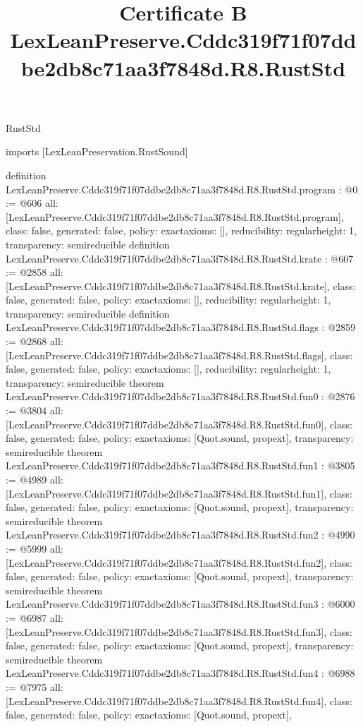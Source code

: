 \begin{lexlean}{RustStd}
\title{Certificate B LexLeanPreserve.Cddc319f71f07ddbe2db8c71aa3f7848d.R8.RustStd}
\begin{coremodule}
imports [LexLeanPreservation.RustSound]

definition LexLeanPreserve.Cddc319f71f07ddbe2db8c71aa3f7848d.R8.RustStd.program : @0 := @606 {
  all: [LexLeanPreserve.Cddc319f71f07ddbe2db8c71aa3f7848d.R8.RustStd.program],
  class: false,
  generated: false,
  policy: exact{axioms: []},
  reducibility: regular{height: 1},
  transparency: semireducible
}
definition LexLeanPreserve.Cddc319f71f07ddbe2db8c71aa3f7848d.R8.RustStd.krate : @607 := @2858 {
  all: [LexLeanPreserve.Cddc319f71f07ddbe2db8c71aa3f7848d.R8.RustStd.krate],
  class: false,
  generated: false,
  policy: exact{axioms: []},
  reducibility: regular{height: 1},
  transparency: semireducible
}
definition LexLeanPreserve.Cddc319f71f07ddbe2db8c71aa3f7848d.R8.RustStd.flags : @2859 := @2868 {
  all: [LexLeanPreserve.Cddc319f71f07ddbe2db8c71aa3f7848d.R8.RustStd.flags],
  class: false,
  generated: false,
  policy: exact{axioms: []},
  reducibility: regular{height: 1},
  transparency: semireducible
}
theorem LexLeanPreserve.Cddc319f71f07ddbe2db8c71aa3f7848d.R8.RustStd.fun0 : @2876 := @3804 {
  all: [LexLeanPreserve.Cddc319f71f07ddbe2db8c71aa3f7848d.R8.RustStd.fun0],
  class: false,
  generated: false,
  policy: exact{axioms: [Quot.sound, propext]},
  transparency: semireducible
}
theorem LexLeanPreserve.Cddc319f71f07ddbe2db8c71aa3f7848d.R8.RustStd.fun1 : @3805 := @4989 {
  all: [LexLeanPreserve.Cddc319f71f07ddbe2db8c71aa3f7848d.R8.RustStd.fun1],
  class: false,
  generated: false,
  policy: exact{axioms: [Quot.sound, propext]},
  transparency: semireducible
}
theorem LexLeanPreserve.Cddc319f71f07ddbe2db8c71aa3f7848d.R8.RustStd.fun2 : @4990 := @5999 {
  all: [LexLeanPreserve.Cddc319f71f07ddbe2db8c71aa3f7848d.R8.RustStd.fun2],
  class: false,
  generated: false,
  policy: exact{axioms: [Quot.sound, propext]},
  transparency: semireducible
}
theorem LexLeanPreserve.Cddc319f71f07ddbe2db8c71aa3f7848d.R8.RustStd.fun3 : @6000 := @6987 {
  all: [LexLeanPreserve.Cddc319f71f07ddbe2db8c71aa3f7848d.R8.RustStd.fun3],
  class: false,
  generated: false,
  policy: exact{axioms: [Quot.sound, propext]},
  transparency: semireducible
}
theorem LexLeanPreserve.Cddc319f71f07ddbe2db8c71aa3f7848d.R8.RustStd.fun4 : @6988 := @7975 {
  all: [LexLeanPreserve.Cddc319f71f07ddbe2db8c71aa3f7848d.R8.RustStd.fun4],
  class: false,
  generated: false,
  policy: exact{axioms: [Quot.sound, propext]},
}
\end{coremodule}
\end{lexlean}
